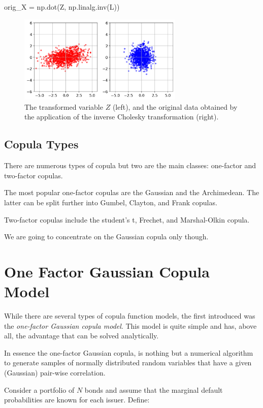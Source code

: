 \begin{ipython}
orig_X = np.dot(Z, np.linalg.inv(L))
\end{ipython}

\begin{figure}[htbp]
\centering
\includegraphics[width=0.7\textwidth]{figures/cholesky_inv}
\caption{The transformed variable $Z$ (left), and the original data obtained by the application of the inverse Cholesky transformation (right).}
\label{fig:cholesky_inv}
\end{figure}

\subsection{Copula Types}
There are numerous types of copula but two are the main classes: one-factor and two-factor copulas.

The most popular one-factor copulas are the Gaussian and the Archimedean. The latter can be split further into Gumbel, Clayton, and Frank copulas.

Two-factor copulas include the student’s t, Frechet, and Marshal-Olkin copula. 

We are going to concentrate on the Gaussian copula only though.

\section{One Factor Gaussian Copula Model}
While there are several types of copula function models, the first introduced was the \emph{one-factor Gaussian copula model}. This model is quite simple and has, above all, the advantage that can be solved analytically. 

In essence the one-factor Gaussian copula, is nothing but a numerical algorithm to generate samples of normally distributed random variables that have a given (Gaussian) pair-wise correlation. 

Consider a portfolio of \(N\) bonds and assume that the marginal default probabilities are known for each issuer. Define:

